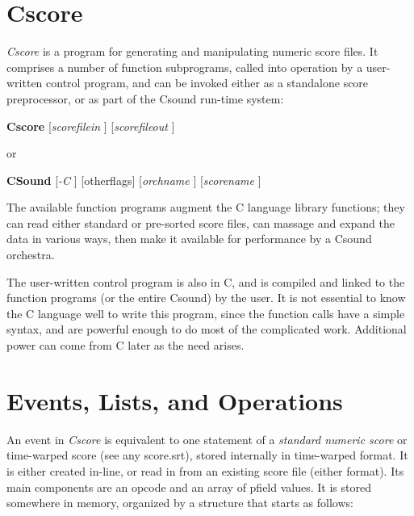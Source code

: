 \begin{comment}
\documentclass[10pt]{article}
\usepackage{fullpage, graphicx, url}
\setlength{\parskip}{1ex}
\setlength{\parindent}{0ex}
\title{Cscore}



\begin{tabular}{ccc}
The Alternative Csound Reference Manual & & \\
Previous & &Next

\end{tabular}

\end{comment}
\section{Cscore}


 \emph{Cscore}
 is a program for generating and manipulating numeric score files. It comprises a number of function subprograms, called into operation by a user-written control program, and can be invoked either as a standalone score preprocessor, or as part of the Csound run-time system: 


 


 \textbf{Cscore}
 [\emph{scorefilein}
] [\emph{scorefileout}
]


 or


 


 \textbf{CSound}
 [\emph{-C}
] [otherflags] [\emph{orchname}
] [\emph{scorename}
]


  The available function programs augment the C language library functions; they can read either standard or pre-sorted score files, can massage and expand the data in various ways, then make it available for performance by a Csound orchestra. 


  The user-written control program is also in C, and is compiled and linked to the function programs (or the entire Csound) by the user. It is not essential to know the C language well to write this program, since the function calls have a simple syntax, and are powerful enough to do most of the complicated work. Additional power can come from C later as the need arises. 
\section{Events, Lists, and Operations}


  An event in \emph{Cscore}
 is equivalent to one statement of a \emph{standard numeric score}
 or time-warped score (see any score.srt), stored internally in time-warped format. It is either created in-line, or read in from an existing score file (either format). Its main components are an opcode and an array of pfield values. It is stored somewhere in memory, organized by a structure that starts as follows: 


